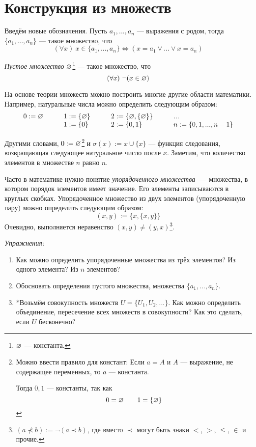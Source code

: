 \section{Конструкция из множеств}

Введём новые обозначения. Пусть $a_1,...,a_{n}$ --- выражения с родом,
тогда $\{a_{1},...,a_{n}\}$ --- такое множество, что
\[
	(\forall x)~x\in \{a_1,...,a_{n}\}\iff (x=a_1\lor...\lor x=a_{n})
\]

{\it Пустое множество} $\varnothing$\footnote{
	$\varnothing$ --- константа.
} --- такое множество, что
\[
	(\forall x)~\lnot(x\in \varnothing)
\]

На основе теории множеств можно построить многие другие области математики.
Например, натуральные числа можно определить следующим образом:
\[
	\begin{array}{llll}
		0  :=\varnothing\qquad & 1  :=\{\varnothing\}\qquad & 2  :=\{\varnothing,\{\varnothing\}\}\qquad & ... \\
		                 & 1:=\{0\}\qquad       & 2:=\{0,1\}
		                 & n:=\{0,1,...,n-1\}
	\end{array}
\]

Другими словами, ${0:=\varnothing}$\footnote{
	Можно ввести правило для констант:
	Если $a=A$ и $A$ --- выражение, не содержащее переменных, то $a$ --- константа.

	Тогда $0,1$ --- константы, так как
	\[
		0=\varnothing\qquad 1=\{\varnothing\}
	\]
} и $\sigma(x):=x\cup \{x\}$ --- функция следования,
возвращающая следующее натуральное число после $x$. Заметим, что количество элементов
в множестве $n$ равно $n$.

Часто в математике нужно понятие {\it упорядоченного множества}~---~множества,
в котором порядок элементов имеет значение. Его элементы записываются
в круглых скобках. Упорядоченное множество из двух элементов (упорядоченную пару)
можно определить следующим образом:
\[
	(x,y):=\{x,\{x,y\}\}
\]
Очевидно, выполняется неравенство $(x,y)\neq (y,x)$\footnote{
	$(a\nprec b):=\lnot(a\prec b)$, где вместо $\prec$ могут быть знаки
	$<$, $>$, $\leq$, $\in$ и прочие.
}.

\vspace{1em}
{\it Упражнения:}
\begin{enumerate}
	\item{}Как можно определить упорядоченные множества из трёх элементов?
	Из одного элемента? Из $n$ элементов?

	\item{}Обосновать определения пустого множества, множества $\{a_1,...,a_{n}\}$.

	\item{}*Возьмём совокупность множеств $U=\{U_{1},U_{2},...\}$.
	Как можно определить объединение, пересечение всех множеств в совокупности?
	Как это сделать, если $U$ бесконечно?
\end{enumerate}

\pagebreak
